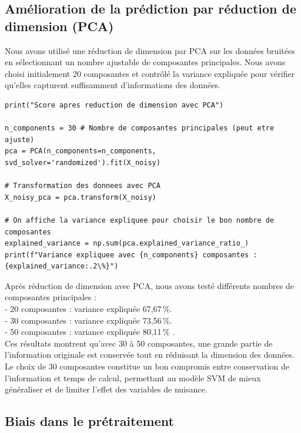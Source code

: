 \documentclass[12pt,a4paper]{report}
\begin{document}
\subsection{Amélioration de la prédiction par réduction de dimension (PCA)}


Nous avons utilisé une réduction de dimension par PCA sur les données bruitées en sélectionnant un nombre ajustable de composantes principales. Nous avons choisi initialement 20 composantes et contrôlé la variance expliquée pour vérifier qu'elles capturent suffisamment d'informations des données.

\begin{lstlisting}
print("Score apres reduction de dimension avec PCA")

n_components = 30 # Nombre de composantes principales (peut etre ajuste)
pca = PCA(n_components=n_components, svd_solver='randomized').fit(X_noisy)

# Transformation des donnees avec PCA
X_noisy_pca = pca.transform(X_noisy)

# On affiche la variance expliquee pour choisir le bon nombre de composantes
explained_variance = np.sum(pca.explained_variance_ratio_)
print(f"Variance expliquee avec {n_components} composantes : {explained_variance:.2\%}")
\end{lstlisting}







Après réduction de dimension avec PCA, nous avons testé différents nombres de composantes principales : \\
- 20 composantes : variance expliquée 67,67\,\%.  \\
- 30 composantes : variance expliquée 73,56\,\%.  \\
- 50 composantes : variance expliquée 80,11\,\% . \\

Ces résultats montrent qu'avec 30 à 50 composantes, une grande partie de l'information originale est conservée tout en réduisant la dimension des données. Le choix de 30 composantes constitue un bon compromis entre conservation de l'information et temps de calcul, permettant au modèle SVM de mieux généraliser et de limiter l'effet des variables de nuisance.





\subsection{ Biais dans le prétraitement}
\end{document}
